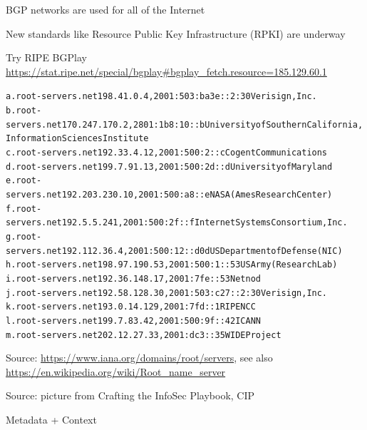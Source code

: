 \documentclass[Screen16to9,17pt]{foils}
\begin{document}


\begin{list2}
\item BGP networks are used for all of the Internet
\item New standards like Resource Public Key Infrastructure (RPKI) are underway
\item Try RIPE BGPlay \url{https://stat.ripe.net/special/bgplay#bgplay_fetch.resource=185.129.60.1}
\end{list2}



\begin{alltt}\small
a.root-servers.net 198.41.0.4, 2001:503:ba3e::2:30 Verisign, Inc.
b.root-servers.net 170.247.170.2, 2801:1b8:10::b University of Southern California,
Information Sciences Institute
c.root-servers.net 192.33.4.12, 2001:500:2::c Cogent Communications
d.root-servers.net 199.7.91.13, 2001:500:2d::d University of Maryland
e.root-servers.net 192.203.230.10, 2001:500:a8::e NASA (Ames Research Center)
f.root-servers.net 192.5.5.241, 2001:500:2f::f Internet Systems Consortium, Inc.
g.root-servers.net 192.112.36.4, 2001:500:12::d0d US Department of Defense (NIC)
h.root-servers.net 198.97.190.53, 2001:500:1::53 US Army (Research Lab)
i.root-servers.net 192.36.148.17, 2001:7fe::53 Netnod
j.root-servers.net 192.58.128.30, 2001:503:c27::2:30 Verisign, Inc.
k.root-servers.net 193.0.14.129, 2001:7fd::1 RIPE NCC
l.root-servers.net 199.7.83.42, 2001:500:9f::42 ICANN
m.root-servers.net 202.12.27.33, 2001:dc3::35 WIDE Project
\end{alltt}
Source: \url{https://www.iana.org/domains/root/servers}, see also \url{https://en.wikipedia.org/wiki/Root_name_server}









Source: picture from Crafting the InfoSec Playbook, CIP

Metadata + Context



\end{document}
